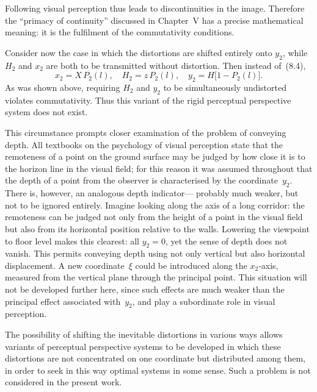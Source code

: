 
Following visual perception thus leads to discontinuities in the image.  Therefore the
``primacy of continuity'' discussed in Chapter~V has a precise mathematical meaning: it
is the fulfilment of the commutativity conditions.

Consider now the case in which the distortions are shifted entirely onto $y_2$, while
$H_2$ and $x_2$ are both to be transmitted without distortion.  Then instead of~(8.4),
\begin{equation}
  x_2 = X\,P_2(l),\quad
  H_2 = z\,P_2(l),\quad
  y_2 = H\bigl[1 - P_2(l)\bigr].  \tag{8.7}
\end{equation}
As was shown above, requiring $H_2$ and $y_2$ to be simultaneously undistorted violates
commutativity.  Thus this variant of the rigid perceptual perspective system does not exist.

This circumstance prompts closer examination of the problem of conveying depth.  All
textbooks on the psychology of visual perception state that the remoteness of a point on
the ground surface may be judged by how close it is to the horizon line in the visual field;
for this reason it was assumed throughout that the depth of a point from the observer is
characterised by the coordinate~$y_2$.  There is, however, an analogous depth indicator---
probably much weaker, but not to be ignored entirely.  Imagine looking along the axis of a
long corridor: the remoteness can be judged not only from the height of a point in the
visual field but also from its horizontal position relative to the walls.  Lowering the
viewpoint to floor level makes this clearest: all $y_2 = 0$, yet the sense of depth does
not vanish.  This permits conveying depth using not only vertical but also horizontal
displacement.  A new coordinate~$\xi$ could be introduced along the $x_2$-axis, measured
from the vertical plane through the principal point.  This situation will not be developed
further here, since such effects are much weaker than the principal effect associated
with~$y_2$, and play a subordinate role in visual perception.


The possibility of shifting the inevitable distortions in various ways allows variants of
perceptual perspective systems to be developed in which these distortions are not
concentrated on one coordinate but distributed among them, in order to seek in this way
optimal systems in some sense.  Such a problem is not considered in the present work.

